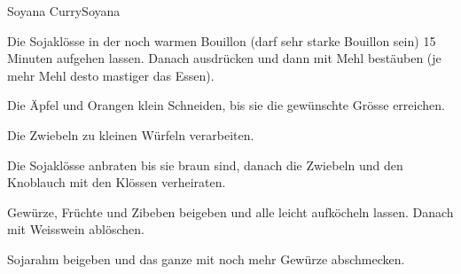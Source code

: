 
\begin{recipe}[]{Soyana Curry}{Soyana}{}




\step
Die Sojakl\"osse in der noch warmen Bouillon (darf sehr starke Bouillon sein) 15 Minuten aufgehen lassen. Danach ausdr\"ucken und dann mit Mehl best\"auben (je mehr Mehl desto mastiger das Essen).

\step
Die \"Apfel und Orangen klein Schneiden, bis sie die gew\"unschte Gr\"osse erreichen.

\step
Die Zwiebeln zu kleinen W\"urfeln verarbeiten.

\step
Die Sojakl\"osse anbraten bis sie braun sind, danach die Zwiebeln und den Knoblauch mit den Kl\"ossen verheiraten.

\step
Gew\"urze, Fr\"uchte und Zibeben beigeben und alle leicht aufk\"ocheln lassen.
Danach mit Weisswein abl\"oschen.

\step
Sojarahm beigeben und das ganze mit noch mehr Gew\"urze abschmecken.


\end{recipe}
